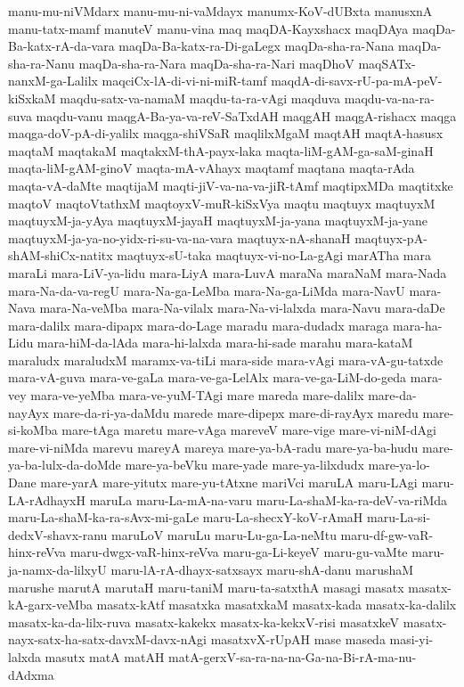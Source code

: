 {manu-mu-niVMdarx
manu-mu-ni-vaMdayx
manumx-KoV-dUBxta
manusxnA
manu-tatx-mamf
manuteV
manu-vina
maq
maqDA-Kayxshacx
maqDAya
maqDa-Ba-katx-rA-da-vara
maqDa-Ba-katx-ra-Di-gaLegx
maqDa-sha-ra-Nana
maqDa-sha-ra-Nanu
maqDa-sha-ra-Nara
maqDa-sha-ra-Nari
maqDhoV
maqSATx-nanxM-ga-Lalilx
maqciCx-lA-di-vi-ni-miR-tamf
maqdA-di-savx-rU-pa-mA-peV-kiSxkaM
maqdu-satx-va-namaM
maqdu-ta-ra-vAgi
maqduva
maqdu-va-na-ra-suva
maqdu-vanu
maqgA-Ba-ya-va-reV-SaTxdAH
maqgAH
maqgA-rishacx
maqga
maqga-doV-pA-di-yalilx
maqga-shiVSaR
maqlilxMgaM
maqtAH
maqtA-hasusx
maqtaM
maqtakaM
maqtakxM-thA-payx-laka
maqta-liM-gAM-ga-saM-ginaH
maqta-liM-gAM-ginoV
maqta-mA-vAhayx
maqtamf
maqtana
maqta-rAda
maqta-vA-daMte
maqtijaM
maqti-jiV-va-na-va-jiR-tAmf
maqtipxMDa
maqtitxke
maqtoV
maqtoVtathxM
maqtoyxV-muR-kiSxVya
maqtu
maqtuyx
maqtuyxM
maqtuyxM-ja-yAya
maqtuyxM-jayaH
maqtuyxM-ja-yana
maqtuyxM-ja-yane
maqtuyxM-ja-ya-no-yidx-ri-su-va-na-vara
maqtuyx-nA-shanaH
maqtuyx-pA-shAM-shiCx-natitx
maqtuyx-sU-taka
maqtuyx-vi-no-La-gAgi
marATha
mara
maraLi
mara-LiV-ya-lidu
mara-LiyA
mara-LuvA
maraNa
maraNaM
mara-Nada
mara-Na-da-va-regU
mara-Na-ga-LeMba
mara-Na-ga-LiMda
mara-NavU
mara-Nava
mara-Na-veMba
mara-Na-vilalx
mara-Na-vi-lalxda
mara-Navu
mara-daDe
mara-dalilx
mara-dipapx
mara-do-Lage
maradu
mara-dudadx
maraga
mara-ha-Lidu
mara-hiM-da-lAda
mara-hi-lalxda
mara-hi-sade
marahu
mara-kataM
maraludx
maraludxM
maramx-va-tiLi
mara-side
mara-vAgi
mara-vA-gu-tatxde
mara-vA-guva
mara-ve-gaLa
mara-ve-ga-LelAlx
mara-ve-ga-LiM-do-geda
mara-vey
mara-ve-yeMba
mara-ve-yuM-TAgi
mare
mareda
mare-dalilx
mare-da-nayAyx
mare-da-ri-ya-daMdu
marede
mare-dipepx
mare-di-rayAyx
maredu
mare-si-koMba
mare-tAga
maretu
mare-vAga
mareveV
mare-vige
mare-vi-niM-dAgi
mare-vi-niMda
marevu
mareyA
mareya
mare-ya-bA-radu
mare-ya-ba-hudu
mare-ya-ba-lulx-da-doMde
mare-ya-beVku
mare-yade
mare-ya-lilxdudx
mare-ya-lo-Dane
mare-yarA
mare-yitutx
mare-yu-tAtxne
mariVci
maruLA
maru-LAgi
maru-LA-rAdhayxH
maruLa
maru-La-mA-na-varu
maru-La-shaM-ka-ra-deV-va-riMda
maru-La-shaM-ka-ra-sAvx-mi-gaLe
maru-La-shecxY-koV-rAmaH
maru-La-si-dedxV-shavx-ranu
maruLoV
maruLu
maru-Lu-ga-La-neMtu
maru-df-gw-vaR-hinx-reVva
maru-dwgx-vaR-hinx-reVva
maru-ga-Li-keyeV
maru-gu-vaMte
maru-ja-namx-da-lilxyU
maru-lA-rA-dhayx-satxsayx
maru-shA-danu
marushaM
marushe
marutA
marutaH
maru-taniM
maru-ta-satxthA
masagi
masatx
masatx-kA-garx-veMba
masatx-kAtf
masatxka
masatxkaM
masatx-kada
masatx-ka-dalilx
masatx-ka-da-lilx-ruva
masatx-kakekx
masatx-ka-kekxV-risi
masatxkeV
masatx-nayx-satx-ha-satx-davxM-davx-nAgi
masatxvX-rUpAH
mase
maseda
masi-yi-lalxda
masutx
matA
matAH
matA-gerxV-sa-ra-na-na-Ga-na-Bi-rA-ma-nu-dAdxma
}
